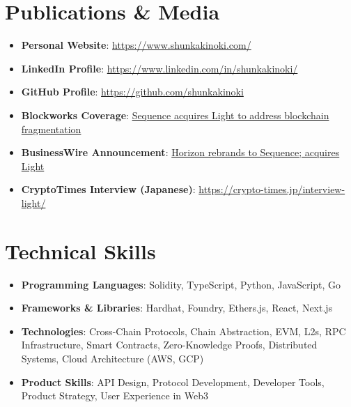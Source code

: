 \documentclass[letterpaper,11pt]{article}
\newcommand{\resumeItem}[2]{
  \item\small{
    \textbf{#1}{: #2 \vspace{-2pt}}
  }
}
\newcommand{\resumeSubHeadingListStart}{\begin{itemize}[leftmargin=*]}
\newcommand{\resumeSubHeadingListEnd}{\end{itemize}}
\begin{document}
\section{Publications \& Media}
  \resumeSubHeadingListStart
    \resumeItem{Personal Website}{\href{https://www.shunkakinoki.com/}{https://www.shunkakinoki.com/}}
    \resumeItem{LinkedIn Profile}{\href{https://www.linkedin.com/in/shunkakinoki/}{https://www.linkedin.com/in/shunkakinoki/}}
    \resumeItem{GitHub Profile}{\href{https://github.com/shunkakinoki}{https://github.com/shunkakinoki}}
    \resumeItem{Blockworks Coverage}{\href{https://blockworks.co/news/exclusive-horizon-blockchain-games-sequence-rebrand}{Sequence acquires Light to address blockchain fragmentation}}
    \resumeItem{BusinessWire Announcement}{\href{https://www.businesswire.com/news/home/20250408247816/en/Horizon-rebrands-to-Sequence-acquires-Light-to-unify-the-EVM-ecosystem-of-blockchains}{Horizon rebrands to Sequence; acquires Light}}
    \resumeItem{CryptoTimes Interview (Japanese)}{\href{https://crypto-times.jp/interview-light/}{https://crypto-times.jp/interview-light/}}
  \resumeSubHeadingListEnd

\section{Technical Skills}
  \resumeSubHeadingListStart
    \resumeItem{Programming Languages}{Solidity, TypeScript, Python, JavaScript, Go}
    \resumeItem{Frameworks \& Libraries}{Hardhat, Foundry, Ethers.js, React, Next.js}
    \resumeItem{Technologies}{Cross-Chain Protocols, Chain Abstraction, EVM, L2s, RPC Infrastructure, Smart Contracts, Zero-Knowledge Proofs, Distributed Systems, Cloud Architecture (AWS, GCP)}
    \resumeItem{Product Skills}{API Design, Protocol Development, Developer Tools, Product Strategy, User Experience in Web3}
  \resumeSubHeadingListEnd
\end{document}
